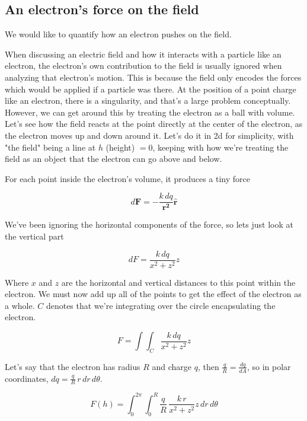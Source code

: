 \documentclass{article}
\begin{document}
\subsection{An electron's force on the field}

We would like to quantify how an electron pushes on the field.

When discussing an electric field and how it interacts with a particle like an electron, the electron's own contribution to the field is usually ignored when analyzing that electron's motion. This is because the field only encodes the forces which would be applied if a particle was there. At the position of a point charge like an electron, there is a singularity, and that's a large problem conceptually. However, we can get around this by treating the electron as a ball with volume. Let's see how the field reacts at the point directly at the center of the electron, as the electron moves up and down around it. Let's do it in 2d for simplicity, with "the field" being a line at $h$ (height) $=0$, keeping with how we're treating the field as an object that the electron can go above and below.

For each point inside the electron's volume, it produces a tiny force

\begin{equation}\label{eqn:coulomb}
    d\mathbf{F} = -\frac{k\,dq}{\mathbf{r^2}}\hat{\mathbf{r}}
\end{equation}

We've been ignoring the horizontal components of the force, so lets just look at the vertical part

\begin{equation}
    dF = \frac{k\,dq}{x^2 + z^2}z
\end{equation}

Where $x$ and $z$ are the horizontal and vertical distances to this point within the electron. We must now add up all of the points to get the effect of the electron as a whole. $C$ denotes that we're integrating over the circle encapsulating the electron.

\begin{equation}
    F = \int\int_{C} \frac{k\,dq}{x^2 + z^2}z
\end{equation}

Let's say that the electron has radius $R$ and charge $q$, then $\frac{q}{R} = \frac{dq}{dA}$, so in polar coordinates, $dq = \frac{q}{R}\,r\,dr\,d\theta$.

\begin{equation}
    F(h) = \int_{0}^{2\pi}\int_{0}^{R} \frac{q}{R}\,\frac{k\,r}{x^2 + z^2}z\,dr\,d\theta
\end{equation}
\end{document}
